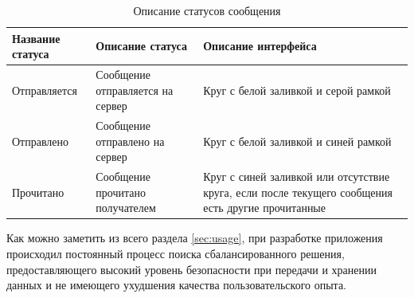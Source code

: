 \begin{table}[!ht]
  \caption{Описание статусов сообщения}
  \label{table:usage:dialogues:statusdesc}
  \centering
  \begin{tabularx}{\linewidth}{
    |>{\centering\hsize=0.75\hsize}X|
    >{\centering\hsize=1\hsize}X|
    >{\centering\arraybackslash\hsize=1.25\hsize}X|
  }
	\hline
	Название статуса & Описание статуса & Описание интерфейса \\

	\hline
	Отправляется & Сообщение отправляется на сервер & Круг с белой заливкой и серой рамкой \\

	\hline
	Отправлено & Сообщение отправлено на сервер & Круг с белой заливкой и синей рамкой \\

	\hline
	Прочитано & Сообщение прочитано получателем & Круг с синей заливкой или отсутствие круга, если после текущего сообщения есть другие прочитанные \\

	\hline
  \end{tabularx}
\end{table}

Как можно заметить из всего раздела \ref{sec:usage}, при разработке приложения происходил постоянный процесс поиска сбалансированного решения, предоставляющего высокий уровень безопасности при передачи и хранении данных и не имеющего ухудшения качества пользовательского опыта.